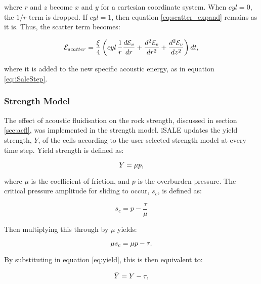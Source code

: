 where $r$ and $z$ become $x$ and $y$ for a cartesian coordinate system. When $cyl=0$, the $1/r$ term is dropped. If $cyl=1$, then equation \ref{eq:scatter_expand} remains as it is. Thus, the scatter term becomes:

\begin{equation}
\mathcal{E}_{scatter} = \frac{\xi}{4} \left(cyl\,\frac{1}{r} \frac{d \mathcal{E}_{v}}{dr} + \frac{d^{2} \mathcal{E}_{v}}{dr^{2}} + \frac{d^{2} \mathcal{E}_{v}}{dz^{2}} \right)dt,\vspace{0.2cm}
\end{equation}

where it is added to the new specific acoustic energy, as in equation \ref{eq:iSaleStep}.

\subsubsection{Strength Model \label{sec:strength}}

\begin{sloppypar}
The effect of acoustic fluidisation on the rock strength, discussed in section \ref{sec:acfl}, was implemented in the \citet{collins2004modeling} strength model. iSALE updates the yield strength, $Y$, of the cells according to the user selected strength model at every time step. Yield strength is defined as:
\end{sloppypar}

\begin{equation} \label{eq:yield}
Y=\mu p, \vspace{0.2cm}
\end{equation}

where $\mu$ is the coefficient of friction, and $p$ is the overburden pressure. The critical pressure amplitude for sliding to occur, $s_{c}$, is defined as:

\begin{equation}
s_c=p -\frac{\tau}{\mu}
\end{equation}

Then multiplying this through by $\mu$ yields:

\begin{equation}
\mu s_c =\mu p - \tau. \vspace{0.2cm}
\end{equation}

By substituting in equation \ref{eq:yield}, this is then equivalent to:

\begin{equation}
\bar{Y}  =Y - \tau, \vspace{0.2cm}
\end{equation}

